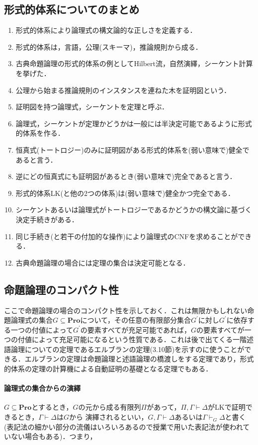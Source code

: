 \documentclass{ltjsarticle}
\theoremstyle{mystyle1}
\theoremstyle{mystyle3}
\theoremstyle{mystyle2}
\newcommand{\bPro}{\ensuremath{\mathbf{Pro}}}
\newcommand{\red}[1]{{\color{red} #1}}
\begin{document}
\subsection{形式的体系についてのまとめ}
\begin{enumerate}
  \item 形式的体系により論理式の構文論的な正しさを定義する．
  \item 形式的体系は，言語，公理(スキーマ)，推論規則から成る．
  \item 古典命題論理の形式的体系の例としてHilbert流，自然演繹，シーケント計算を挙げた．
  \item 公理から始まる推論規則のインスタンスを連ねた木を証明図という．
  \item 証明図を持つ論理式，シーケントを定理と呼ぶ．
  \item 論理式，シーケントが定理かどうかは一般には半決定可能であるように形式的体系を作る．
  \item 恒真式(トートロジー)のみに証明図がある形式的体系を(弱い意味で)健全であると言う．
  \item 逆にどの恒真式にも証明図があるとき(弱い意味で)完全であると言う．
  \item 形式的体系LK(と他の2つの体系)は(弱い意味で)健全かつ完全である．
  \item シーケントあるいは論理式がトートロジーであるかどうかの構文論に基づく決定手続きがある．
  \item 同じ手続き(と若干の付加的な操作)により論理式のCNFを求めることができる．
  \item 古典命題論理の場合には定理の集合は決定可能となる．
\end{enumerate}

\subsection{命題論理のコンパクト性}
ここで命題論理の場合のコンパクト性を示しておく．これは無限かもしれない命題論理式の集合$G\subseteq\bPro$について，その任意の有限部分集合$G^\prime$に対し$G^\prime$に依存する一つの付値によって$G^\prime$の要素すべてが充足可能であれば，$G$の要素すべてが一つの付値によって充足可能になるという性質である．これは後で出てくる一階述語論理についての定理であるエルブランの定理(3.10節)を示すのに使うことができる．エルブランの定理は命題論理と述語論理の橋渡しをする定理であり，形式的体系の定理の計算機による自動証明の基礎となる定理でもある．
\paragraph{論理式の集合からの演繹}
$G\subseteq\bPro$とするとき，$G$の元から成る有限列$\Pi$があって，$\Pi,\Gamma\vdash\Delta$がLKで証明できるとき，$\Gamma\vdash\Delta$は$G$から\red{演繹される}といい，$G,\Gamma\vdash\Delta$あるいは$\Gamma\vdash_G\Delta$と書く(表記法の細かい部分の流儀はいろいろあるので授業で用いた表記法が使われていない場合もある)．つまり，
\end{document}
